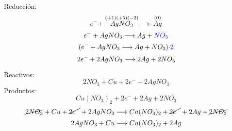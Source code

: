 \documentclass[../practica.root.tex]{subfiles}
\begin{document}
\begin{enumerate}
\begin{enumerate}
\begin{multicols}{2}
			            Reducción:
			            \[ \textcolor{blue}{e^-} + \stackrel{(+1)(+5)(-2)}{AgNO_3} \longrightarrow{} \stackrel{(0)}{Ag} \]
			            \[ e^- + AgNO_3 \longrightarrow{} Ag + \textcolor{blue}{NO_3} \]
			            \[ (e^- + AgNO_3 \longrightarrow{} Ag + NO_3)\textcolor{blue}{\cdot 2} \]
			            \[ 2 e^- + 2 AgNO_3 \longrightarrow{} 2 Ag + 2 NO_3 \]
		            \end{multicols}


		            Reactivos:
		            \[ 2 NO_3 + Cu + 2 e^- + 2 AgNO_3 \]
		            Productos:
		            \[ Cu(NO_3)_2 + 2 e^- + 2 Ag + 2 NO_3 \]
		            \[ \cancel{2 NO_3} + Cu + \cancel{2 e^-} + 2 AgNO_3 \longrightarrow{} Cu(NO_3)_2 + \cancel{2 e^-} + 2 Ag + \cancel{2 NO_3} \]
		            \[ 2 AgNO_3 + Cu \longrightarrow{} Cu(NO_3)_2 + 2 Ag \]
	      \end{enumerate}
\end{enumerate}
\end{document}
